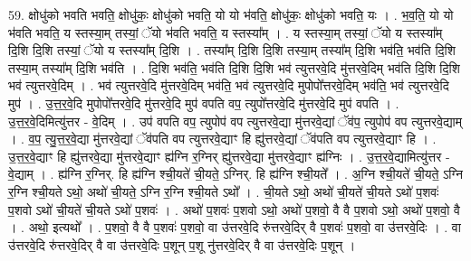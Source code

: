 \documentclass[17pt]{extarticle}
\begin{document}
59. क्षोधु॑को भवति भवति॒ क्षोधु॑कः॒ क्षोधु॑को भवति॒ यो यो भ॑वति॒ क्षोधु॑कः॒ क्षोधु॑को भवति॒ यः । . भ॒व॒ति॒ यो यो भ॑वति भवति॒ य स्तस्या॒म् तस्यां॒ ॅयो भ॑वति भवति॒ य स्तस्या᳚म् । . य स्तस्या॒म् तस्यां॒ ॅयो य स्तस्या᳚म् दि॒शि दि॒शि तस्यां॒ ॅयो य स्तस्या᳚म् दि॒शि । . तस्या᳚म् दि॒शि दि॒शि तस्या॒म् तस्या᳚म् दि॒शि भव॑ति॒ भव॑ति दि॒शि तस्या॒म् तस्या᳚म् दि॒शि भव॑ति । . दि॒शि भव॑ति॒ भव॑ति दि॒शि दि॒शि भव॑ त्युत्तरवे॒दि मु॑त्तरवे॒दिम् भव॑ति दि॒शि दि॒शि भव॑ त्युत्तरवे॒दिम् । . भव॑ त्युत्तरवे॒दि मु॑त्तरवे॒दिम् भव॑ति॒ भव॑ त्युत्तरवे॒दि मुपोपो᳚त्तरवे॒दिम् भव॑ति॒ भव॑ त्युत्तरवे॒दि मुप॑ । . उ॒त्त॒र॒वे॒दि मुपोपो᳚त्तरवे॒दि मु॑त्तरवे॒दि मुप॑ वपति वप॒ त्युपो᳚त्तरवे॒दि मु॑त्तरवे॒दि मुप॑ वपति । . उ॒त्त॒र॒वे॒दिमित्यु॑त्तर - वे॒दिम् । . उप॑ वपति वप॒ त्युपोप॑ वप त्युत्तरवे॒द्या मु॑त्तरवे॒द्यां ॅव॑प॒ त्युपोप॑ वप त्युत्तरवे॒द्याम् । . व॒प॒ त्यु॒त्त॒र॒वे॒द्या मु॑त्तरवे॒द्यां ॅव॑पति वप त्युत्तरवे॒द्याꣳ हि ह्यु॑त्तरवे॒द्यां ॅव॑पति वप त्युत्तरवे॒द्याꣳ हि । . उ॒त्त॒र॒वे॒द्याꣳ हि ह्यु॑त्तरवे॒द्या मु॑त्तरवे॒द्याꣳ ह्य॑ग्नि र॒ग्निर् ह्यु॑त्तरवे॒द्या मु॑त्तरवे॒द्याꣳ ह्य॑ग्निः । . उ॒त्त॒र॒वे॒द्यामित्यु॑त्तर - वे॒द्याम् । . ह्य॑ग्नि र॒ग्निर्. हि ह्य॑ग्नि श्ची॒यते॑ ची॒यते॒ ऽग्निर्. हि ह्य॑ग्नि श्ची॒यते᳚ । . अ॒ग्नि श्ची॒यते॑ ची॒यते॒ ऽग्नि र॒ग्नि श्ची॒यते ऽथो॒ अथो॑ ची॒यते॒ ऽग्नि र॒ग्नि श्ची॒यते ऽथो᳚ । . ची॒यते ऽथो॒ अथो॑ ची॒यते॑ ची॒यते ऽथो॑ प॒शवः॑ प॒शवो ऽथो॑ ची॒यते॑ ची॒यते ऽथो॑ प॒शवः॑ । . अथो॑ प॒शवः॑ प॒शवो ऽथो॒ अथो॑ प॒शवो॒ वै वै प॒शवो ऽथो॒ अथो॑ प॒शवो॒ वै । . अथो॒ इत्यथो᳚ । . प॒शवो॒ वै वै प॒शवः॑ प॒शवो॒ वा उ॑त्तरवे॒दि रु॑त्तरवे॒दिर् वै प॒शवः॑ प॒शवो॒ वा उ॑त्तरवे॒दिः । . वा उ॑त्तरवे॒दि रु॑त्तरवे॒दिर् वै वा उ॑त्तरवे॒दिः प॒शून् प॒शू नु॑त्तरवे॒दिर् वै वा उ॑त्तरवे॒दिः प॒शून् । \newline
\end{document}
